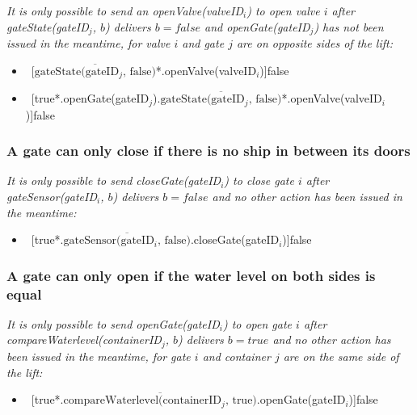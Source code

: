 \textit{It is only possible to send an openValve(valveID$_i$) to open valve $i$ after gateState(gateID$_j$, $ b $) delivers $b = false$ and openGate(gateID$_j$) has not been issued in the meantime, for valve $i$ and gate $j$ are on opposite sides of the lift:}
	\begin{itemize}
		\item ~[$\overline{\textrm{gateState(gateID$_j$, false)}}$*.openValve(valveID$_i$)]false
		\item ~[true*.openGate(gateID$_j$).$\overline{\textrm{gateState(gateID$_j$, false)}}$*.openValve(valveID$_i$)]false
	\end{itemize}
	
\subsubsection{A gate can only close if there is no ship in between its doors}
\textit{It is only possible to send closeGate(gateID$_i$) to close gate $i$ after gateSensor(gateID$_i$, $b$) delivers $b = false$ and no other action has been issued in the meantime:}
	\begin{itemize}
		\item ~[true*.$\overline{\textrm{gateSensor(gateID$_i$, false)}}$.closeGate(gateID$_i$)]false
	\end{itemize}
	
\subsubsection{A gate can only open if the water level on both sides is equal}
\textit{It is only possible to send openGate(gateID$_i$) to open gate $i$ after \linebreak compareWaterlevel(containerID$_j$, $b$) delivers $b = true$ and no other action has been issued in the meantime, for gate $i$ and container $j$ are on the same side of the lift:}
	\begin{itemize}
		\item ~[true*.$\overline{\textrm{compareWaterlevel(containerID$_j$, true)}}$.openGate(gateID$_i$)]false
	\end{itemize}

